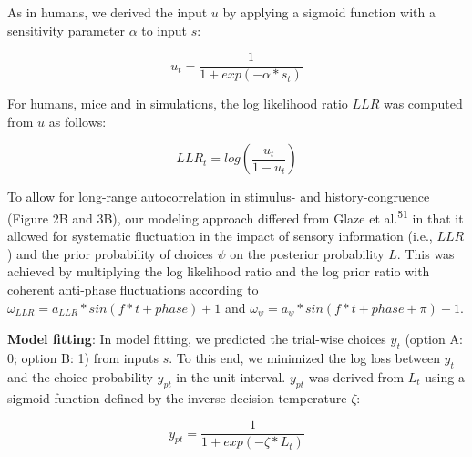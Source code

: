 \documentclass[
]{article}
\begin{document}
As in humans, we derived the input \(u\) by applying a sigmoid function
with a sensitivity parameter \(\alpha\) to input \(s\):

\begin{equation}
u_t = \frac{1}{1 + exp(-\alpha * s_t)}
\end{equation}

For humans, mice and in simulations, the log likelihood ratio \(LLR\)
was computed from \(u\) as follows:

\begin{equation}
LLR_t = log(\frac{u_t}{1-u_t})
\end{equation}

To allow for long-range autocorrelation in stimulus- and
history-congruence (Figure 2B and 3B), our modeling approach differed
from Glaze et al.\textsuperscript{51} in that it allowed for systematic
fluctuation in the impact of sensory information (i.e., \(LLR\)) and the
prior probability of choices \(\psi\) on the posterior probability
\(L\). This was achieved by multiplying the log likelihood ratio and the
log prior ratio with coherent anti-phase fluctuations according to
\(\omega_{LLR} = a_{LLR} * sin(f * t + phase) + 1\) and
\(\omega_{\psi} = a_{\psi} * sin(f * t + phase + \pi) + 1\).

\textbf{Model fitting}: In model fitting, we predicted the trial-wise
choices \(y_t\) (option A: 0; option B: 1) from inputs \(s\). To this
end, we minimized the log loss between \(y_t\) and the choice
probability \(y_{p t}\) in the unit interval. \(y_{p t}\) was derived
from \(L_t\) using a sigmoid function defined by the inverse decision
temperature \(\zeta\):

\begin{equation}
y_{p t} = \frac{1}{1 + exp(-\zeta * L_t)}
\end{equation}
\end{document}
